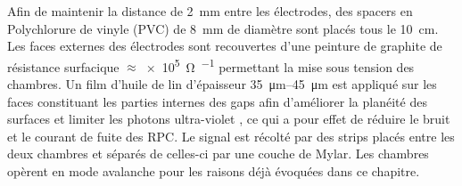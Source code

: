 Afin de maintenir la distance de \SI{2}{\milli\meter} entre les électrodes, des spacers en Polychlorure de vinyle (PVC) de \SI{8}{\milli\meter} de diamètre sont placés tous le \SI{10}{\centi\meter}. Les faces externes des électrodes sont recouvertes d'une peinture de graphite de résistance surfacique $\approx$\SI{e5}{\ohm\per\sq} permettant la mise sous tension des chambres. Un film d'huile de lin d'épaisseur \SIrange{35}{45}{\micro\meter} est appliqué sur les faces constituant les parties internes des gaps afin d'améliorer la planéité des surfaces \cite{oil} et limiter les photons ultra-violet \cite{Lu:2009zzd}, ce qui a pour effet  de réduire le bruit et le courant de fuite des RPC.
Le signal est récolté par des strips placés entre les deux chambres et séparés de celles-ci par une couche de Mylar. Les chambres opèrent en mode avalanche pour les raisons déjà évoquées dans ce chapitre.

